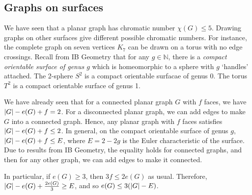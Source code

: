 \subsection{Graphs on surfaces}
We have seen that a planar graph has chromatic number \( \chi(G) \leq 5 \).
Drawing graphs on other surfaces give different possible chromatic numbers.
For instance, the complete graph on seven vertices \( K_7 \) can be drawn on a torus with no edge crossings.
Recall from IB Geometry that for any \( g \in \mathbb N \), there is a \emph{compact orientable surface of genus \( g \)} which is homeomorphic to a sphere with \( g \) `handles' attached.
The 2-sphere \( S^2 \) is a compact orientable surfacae of genus 0.
The torus \( T^2 \) is a compact orientable surface of genus 1.

We have already seen that for a connected planar graph \( G \) with \( f \) faces, we have \( \abs{G} - e(G) + f = 2 \).
For a disconnected planar graph, we can add edges to make \( G \) into a connected graph.
Hence, any planar graph with \( f \) faces satisfies \( \abs{G} - e(G) + f \leq 2 \).
In general, on the compact orientable surface of genus \( g \), \( \abs{G} - e(G) + f \leq E \), where \( E = 2 - 2g \) is the Euler characteristic of the surface.
Due to results from IB Geometry, the equality holds for connected graphs, and then for any other graph, we can add edges to make it connected.

In particular, if \( e(G) \geq 3 \), then \( 3f \leq 2e(G) \) as usual.
Therefore, \( \abs{G} - e(G) + \frac{2e(G)}{3} \geq E \), and so \( e(G) \leq 3(\abs{G} - E) \).

